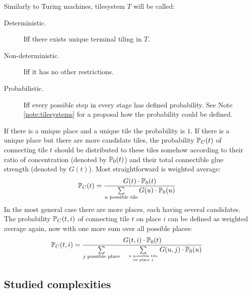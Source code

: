 	Similarly to Turing machines, tilesystem $T$ will be called:
	\begin{description}
		\item[Deterministic.] Iff there exists unique terminal tiling in $T$. %
		\item[Non-deterministic.] Iff it has no other restrictions. %
		\item[Probabilistic.] Iff every possible step in every stage has defined probability. See Note \ref{note:tilesystems} for a proposal how the probability could be defined.
	\end{description}
	
	\begin{note}\label{note:tilesystems}
		If there is a unique place and a unique tile the probability is $1$. If there is a unique place but there are more candidate tiles, the probability $\mathbb{P}_C(t)$ of connecting tile $t$ should be distributed to these tiles somehow according to their ratio of concentration (denoted by $\mathbb{P}_0(t)$) and their total connectible glue strength (denoted by $G(t)$). Most straightforward is weighted average:
		\begin{equation*}
			\mathbb{P}_C(t) = \frac{G(t)\cdot\mathbb{P}_0(t)}{\sum\limits_{u\textnormal{ possible tile}}G(u)\cdot\mathbb{P}_0(u)}
		\end{equation*}
		In the most general case there are more places, each having several candidates. The probability $\mathbb{P}_C(t,i)$ of connecting tile $t$ on place $i$ can be defined as weighted average again, now with one more sum over all possible places:
		\begin{equation*}
			\mathbb{P}_C(t,i) = \frac{G(t,i)\cdot\mathbb{P}_0(t)}{\sum\limits_{j\textnormal{ possible place}}\quad\sum\limits_{u\textnormal{ possible tile}\atop\textnormal{on place }j}G(u,j)\cdot\mathbb{P}_0(u)}
		\end{equation*}
	\end{note}

\subsection{Studied complexities}
	
